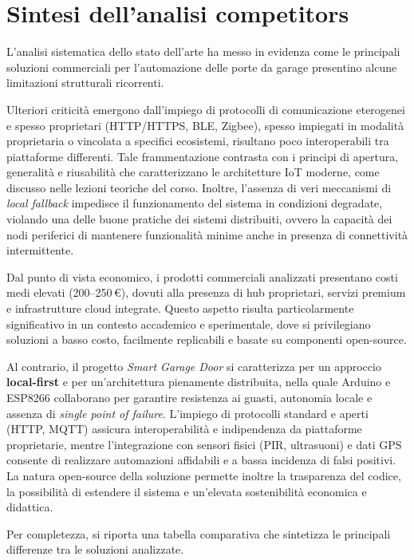 \section*{Sintesi dell'analisi competitors}

L’analisi sistematica dello stato dell’arte ha messo in evidenza come le principali soluzioni commerciali per l’automazione delle porte da garage presentino alcune limitazioni strutturali ricorrenti.

Ulteriori criticità emergono dall’impiego di protocolli di comunicazione eterogenei e spesso proprietari (HTTP/HTTPS, BLE, Zigbee), spesso impiegati in modalità proprietaria o vincolata a specifici ecosistemi, risultano poco interoperabili tra piattaforme differenti. Tale frammentazione contrasta con i principi di apertura, generalità e riusabilità che caratterizzano le architetture IoT moderne, come discusso nelle lezioni teoriche del corso. Inoltre, l’assenza di veri meccanismi di \textit{local fallback} impedisce il funzionamento del sistema in condizioni degradate, violando una delle buone pratiche dei sistemi distribuiti, ovvero la capacità dei nodi periferici di mantenere funzionalità minime anche in presenza di connettività intermittente.

Dal punto di vista economico, i prodotti commerciali analizzati presentano costi medi elevati (200–250\,€), dovuti alla presenza di hub proprietari, servizi premium e infrastrutture cloud integrate. Questo aspetto risulta particolarmente significativo in un contesto accademico e sperimentale, dove si privilegiano soluzioni a basso costo, facilmente replicabili e basate su componenti open-source.

Al contrario, il progetto \textit{Smart Garage Door} si caratterizza per un approccio \textbf{local-first} e per un’architettura pienamente distribuita, nella quale Arduino e ESP8266 collaborano per garantire resistenza ai guasti, autonomia locale e assenza di \textit{single point of failure}. L’impiego di protocolli standard e aperti (HTTP, MQTT) assicura interoperabilità e indipendenza da piattaforme proprietarie, mentre l’integrazione con sensori fisici (PIR, ultrasuoni) e dati GPS consente di realizzare automazioni affidabili e a bassa incidenza di falsi positivi. La natura open-source della soluzione permette inoltre la trasparenza del codice, la possibilità di estendere il sistema e un’elevata sostenibilità economica e didattica.

Per completezza, si riporta una tabella comparativa che sintetizza le principali differenze tra le soluzioni analizzate.

